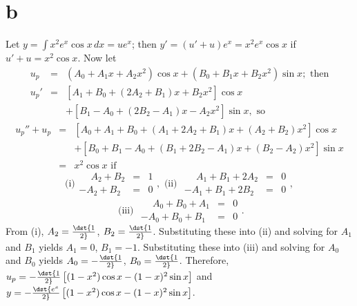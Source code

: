 \documentclass[dvips]{book}
\numberwithin{example}{section}
\numberwithin{equation}{section}
\numberwithin{theorem}{section}
\numberwithin{table}{section}
\numberwithin{figure}{section}
\begin{document}
\part{b} Let $y=\int x^2e^x\cos x\,dx=ue^x$; then
$y'=(u'+u)e^x=x^2e^x\cos x$ if $u'+u=x^2\cos x$. Now let
\begin{eqnarray*}
u_p&=&(A_0+A_1x+A_2x^2)\cos x +(B_0+B_1x+B_2x^2)\sin x;\mbox{ then}\\
u_p'&=&\left[A_1+B_0+(2A_2+B_1)x+B_2x^2\right]\cos x\\ &&
+\left[B_1-A_0+(2B_2-A_1)x-A_2x^2\right]\sin x, \mbox{ so}
\end{eqnarray*}
\begin{eqnarray*}
u_p''+u_p&=&\left[A_0+A_1+B_0+(A_1+2A_2+B_1)x+(A_2+B_2)x^2\right]\cos
x\\ && +\left[B_0+B_1-A_0+(B_1+2B_2-A_1)x+(B_2-A_2)x^2\right]\sin x\\
&=&x^2\cos x \mbox{ if}
\end{eqnarray*}
$$
\mbox{(i)}
\begin{array}{rcl} \phantom{-}A_2+B_2&=&1\\ -A_2+B_2&=&0 \end{array},
\mbox{ (ii) }
\begin{array}{rcl}
\phantom{-}A_1+B_1+2A_2&=&0\\ -A_1+B_1+2B_2&=&0\end{array},
$$
$$
\mbox{ (iii) }
\begin{array}{rcl} \phantom{-}A_0+B_0+A_1&=&0\\ -A_0+B_0+B_1&=&0
\end{array}.
$$
From (i), $A_2=\dst{1\over2}$, $B_2=\dst{1\over2}$. Substituting these
into (ii) and solving for $A_1$ and $B_1$ yields $A_1=0$, $B_1=-1$.
Substituting these into (iii) and solving for $A_0$ and $B_0$ yields
$A_0=-\dst{1\over2}$, $B_0=\dst{1\over2}$. Therefore,
$u_p=-\dst{1\over2}\left[(1-x^2)\cos x-(1-x)^2\sin x\right]$ and
$y=-\dst{e^x\over2}\left[(1-x^2)\cos x-(1-x)^2\sin x\right]$.
\end{document}
